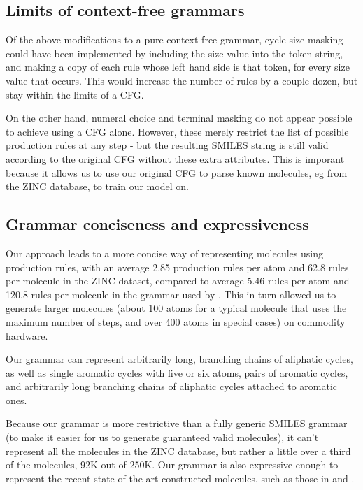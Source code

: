\documentclass[11pt]{article}
\begin{document}
\subsection{Limits of context-free grammars}
Of the above modifications to a pure context-free grammar, cycle size masking could have been implemented by including the size value into the token string, and making a copy of each rule whose left hand side is that token, for every size value that occurs. This would increase the number of rules by a couple dozen, but stay within the limits of a CFG.

On the other hand, numeral choice and terminal masking do not appear possible to achieve using a CFG alone. However, these merely restrict the list of possible production rules at any step - but the resulting SMILES string is still valid according to the original CFG without these extra attributes. This is imporant because it allows us to use our original CFG to parse known molecules, eg from the ZINC database, to train our model on.


\subsection{Grammar conciseness and expressiveness}\label{sec:expressiveness}
Our approach leads to a more concise way of representing molecules using production rules, with an average 2.85 production rules per atom and 62.8 rules per molecule in the ZINC dataset, compared to average 5.46 rules per atom and 120.8 rules per molecule in the grammar used by \cite{kusner17}. This in turn allowed us to generate larger molecules (about 100 atoms for a typical molecule that uses the maximum number of steps, and over 400 atoms in special cases) on commodity hardware.

Our grammar can represent arbitrarily long, branching chains of aliphatic cycles, as well as single aromatic cycles with five or six atoms, pairs of aromatic cycles, and arbitrarily long branching chains of aliphatic cycles attached to aromatic ones.

Because our grammar is more restrictive than a fully generic SMILES grammar (to make it easier for us to generate guaranteed valid molecules), it can't represent all the molecules in the ZINC database, but rather a little over a third of the molecules, 92K out of 250K. Our grammar is also  expressive enough to represent the recent state-of-the art constructed molecules, such as those in \cite{kusner17} and \cite{jin18}. 
\end{document}
